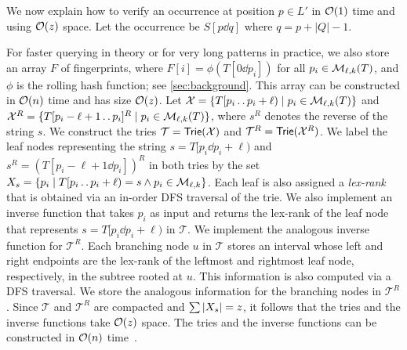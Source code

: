 We now explain how to verify an occurrence at position $p \in L'$ in $\mathcal{O}(1)$ time and
using $\mathcal{O}(z)$ space.
Let the occurrence be $S[p \dd q]$
where $q=p+|Q|-1$. 

For faster querying in theory or for very long patterns in practice, we also store an array $F$ of fingerprints, where $F[i] = \phi(T[0 \dd p_i])$ for all $p_i\in \mathcal{M}_{\ell,k}(T)$, and $\phi$ is the rolling hash function; see \cref{sec:background}. 
This array can be constructed in $\mathcal{O}(n)$ time and has size $\mathcal{O}(z)$.
Let $\mathcal{X} = \{T[p_i\mathinner{.\,.} p_i+\ell) \mid p_i \in \mathcal{M}_{\ell,k}(T)\}$ and $\mathcal{X}^R = \{T[p_i-\ell+1\mathinner{.\,.} p_i]^R \mid p_i \in \mathcal{M}_{\ell,k}(T)\}$, where $s^R$ denotes the reverse of the string $s$.
We construct the tries $\mathcal{T} = \textup{\textsf{Trie}}(\mathcal{X})$ and $\mathcal{T}^R = \textup{\textsf{Trie}}(\mathcal{X}^R)$.
We label the leaf nodes representing the string $s=T[p_i\dd p_i+\ell)$ and $s^R=(T[p_i-\ell+1\dd p_i])^R$ in both tries by the set
$X_s = \{ p_i \mid T[p_i \mathinner{.\,.} p_i+\ell)=s \wedge p_i \in \mathcal{M}_{\ell,k} \}$. 
Each leaf is also assigned a \emph{lex-rank} that is obtained via an in-order DFS traversal of the trie.
We also implement an inverse function that takes $p_i$ as input and returns the lex-rank of the leaf node that represents $s=T[p_i\dd p_i+\ell)$ in $\mathcal{T}$.
We implement the analogous inverse function for $\mathcal{T}^R$.
Each branching node $u$ in $\mathcal{T}$ stores an interval whose left and right endpoints are the lex-rank of the leftmost and rightmost leaf node, respectively,
in the subtree rooted at $u$. This information is also computed via a DFS traversal.
We store the analogous information for the branching nodes in $\mathcal{T}^R$.
Since $\mathcal{T}$ and $\mathcal{T}^R$ are compacted and $\sum |X_s| = z$, it follows that the tries and the inverse functions take $\mathcal{O}(z)$ space. The tries and the inverse functions can be constructed in $\mathcal{O}(n)$ time~\cite{DBLP:journals/jea/Charalampopoulos20}.

